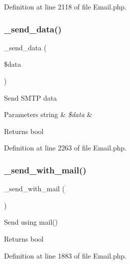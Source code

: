 Definition at line 2118 of file Email.\+php.

\mbox{\label{class_c_i___email_a42fa768e8678b3c1462762b9b812a302}} 
\subsubsection{\texorpdfstring{\_send\_data()}{\_send\_data()}}
{\footnotesize\ttfamily \+\_\+send\+\_\+data (\begin{DoxyParamCaption}\item[{}]{\$data }\end{DoxyParamCaption})\hspace{0.3cm}{\ttfamily [protected]}}

Send S\+M\+TP data


\begin{DoxyParams}[1]{Parameters}
string & {\em \$data} & \\
\hline
\end{DoxyParams}
\begin{DoxyReturn}{Returns}
bool 
\end{DoxyReturn}


Definition at line 2263 of file Email.\+php.

\mbox{\label{class_c_i___email_ae7e626556c4d619a7214bee6056badd4}} 
\subsubsection{\texorpdfstring{\_send\_with\_mail()}{\_send\_with\_mail()}}
{\footnotesize\ttfamily \+\_\+send\+\_\+with\+\_\+mail (\begin{DoxyParamCaption}{ }\end{DoxyParamCaption})\hspace{0.3cm}{\ttfamily [protected]}}

Send using mail()

\begin{DoxyReturn}{Returns}
bool 
\end{DoxyReturn}


Definition at line 1883 of file Email.\+php.

\mbox{\label{class_c_i___email_a22ce9dc271da86e2a25041aa70e02502}} 
